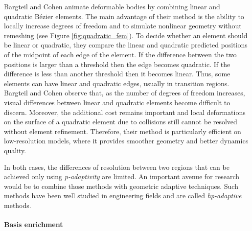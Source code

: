 Bargteil and Cohen \cite{bargteil2014animation} animate deformable bodies by combining linear and quadratic B{\'e}zier elements.
The main advantage of their method is the ability to locally increase degrees of freedom and to simulate nonlinear geometry without remeshing (see Figure \ref{fig:quadratic_fem}).
To decide whether an element should be linear or quadratic, they compare the linear and quadratic predicted positions of the midpoint of each edge of the element. If the difference between the two positions is larger than a threshold then the edge becomes quadratic. If the difference is less than another threshold then it becomes linear. Thus, some elements can have linear and quadratic edges, usually in transition regions. Bargteil and Cohen observe that, as the number of degrees of freedom increases, visual differences between linear and quadratic elements become difficult to discern. Moreover, the additional cost remains important and local deformations on the surface of a quadratic element due to collisions still cannot be resolved without element refinement. Therefore, their method is particularly efficient on low-resolution models, where it provides smoother geometry and better dynamics quality.

In both cases, the differences of resolution between two regions that can be achieved only using \emph{p-adaptivity} are limited. An important avenue for research would be to combine those methods with geometric adaptive techniques. Such methods have been well studied in engineering fields and are called \emph{hp-adaptive} methods.

\paragraph*{Basis enrichment}

